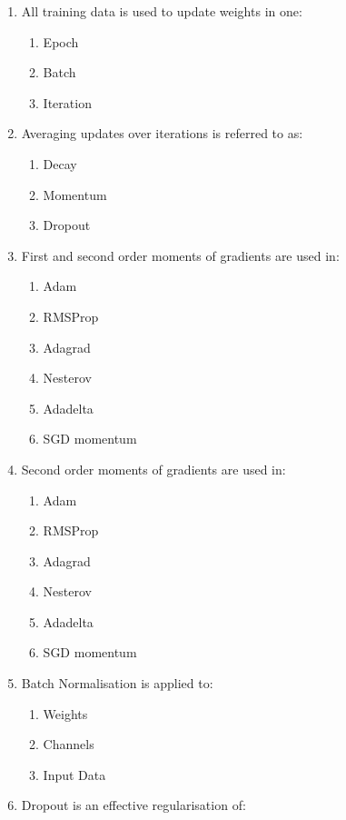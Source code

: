 \documentclass{report}
\numberwithin{equation}{section}
\begin{document}
\begin{enumerate}
    \item All training data is used to update weights in one:
    \begin{enumerate}[label=\alph*.]
        \item Epoch
        \item Batch
        \item Iteration
    \end{enumerate}
    \item Averaging updates over iterations is referred to as:
    \begin{enumerate}[label=\alph*.]
        \item Decay
        \item Momentum
        \item Dropout
    \end{enumerate}
    \item First and second order moments of gradients are used in:
    \begin{enumerate}[label=\alph*.]
        \item Adam
        \item RMSProp
        \item Adagrad
        \item Nesterov
        \item Adadelta
        \item SGD momentum
    \end{enumerate}
    \item Second order moments of gradients are used in:
    \begin{enumerate}[label=\alph*.]
        \item Adam
        \item RMSProp
        \item Adagrad
        \item Nesterov
        \item Adadelta
        \item SGD momentum
    \end{enumerate}
    \item Batch Normalisation is applied to:
    \begin{enumerate}[label=\alph*.]
        \item Weights
        \item Channels
        \item Input Data
    \end{enumerate}
    \item Dropout is an effective regularisation of:
    \begin{enumerate}[label=\alph*.]

\end{enumerate}
\end{enumerate}
\end{document}
